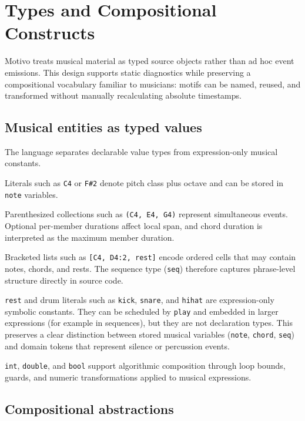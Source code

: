 \section{Types and Compositional Constructs}\label{sec:musical-primitives}

Motivo treats musical material as typed source objects rather than ad hoc event emissions.
This design supports static diagnostics while preserving a compositional vocabulary familiar to musicians:
motifs can be named, reused, and transformed without manually recalculating absolute timestamps.

\subsection{Musical entities as typed values}

The language separates declarable value types from expression-only musical constants.

Literals such as \texttt{C4} or \texttt{F\#2} denote pitch class plus octave and can be stored in \texttt{note}
variables.

Parenthesized collections such as \texttt{(C4, E4, G4)} represent simultaneous events.
Optional per-member durations affect local span, and chord duration is interpreted as the maximum member duration.

Bracketed lists such as \texttt{[C4, D4:2, rest]} encode ordered cells that may contain notes, chords, and rests.
The sequence type (\texttt{seq}) therefore captures phrase-level structure directly in source code.

\texttt{rest} and drum literals such as \texttt{kick}, \texttt{snare}, and \texttt{hihat} are expression-only symbolic
constants.
They can be scheduled by \texttt{play} and embedded in larger expressions (for example in sequences), but they are not
declaration types.
This preserves a clear distinction between stored musical variables (\texttt{note}, \texttt{chord}, \texttt{seq}) and
domain tokens that represent silence or percussion events.

\texttt{int}, \texttt{double}, and \texttt{bool} support algorithmic composition through loop bounds, guards, and
numeric transformations applied to musical expressions.

\subsection{Compositional abstractions}

